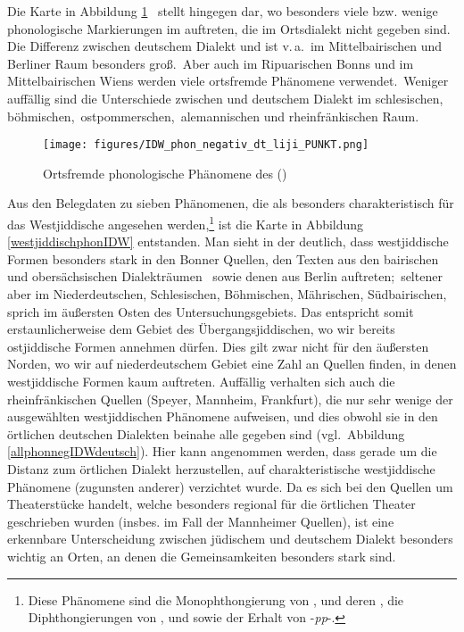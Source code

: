 {  
  
 Die Karte in Abbildung \ref{allphonnegIDW} \,%
  stellt hingegen dar, wo besonders viele bzw. wenige phonologische Markierungen im  auftreten, die im Ortsdialekt nicht gegeben sind. Die Differenz zwischen deutschem Dialekt und  ist v.\,a.\, im Mittelbairischen und Berliner Raum besonders groß.\, Aber auch im Ripuarischen Bonns und im Mittelbairischen Wiens werden viele ortsfremde Phänomene verwendet.\,  Weniger auffällig sind die Unterschiede zwischen  und deutschem Dialekt im schlesischen,\, böhmischen,\, ostpommerschen,\, alemannischen und rheinfränkischen Raum.
 

 \begin{figure} 
  \farbgrafik
		\centering
\texttt{[image: figures/IDW\_phon\_negativ\_dt\_liji\_PUNKT.png]}
		\caption{\label{allphonnegIDW} Ortsfremde phonologische Phänomene des  ()}
		\end{figure}

   
 Aus den Belegdaten zu sieben Phänomenen, die als besonders charakteristisch für das Westjiddische angesehen werden,\footnote{Diese Phänomene sind die Monophthongierung von ,  und deren , die Diphthongierungen von ,  und  sowie der Erhalt von {\germ} -\textit{pp}-.} ist die Karte in Abbildung \ref{westjiddischphonIDW} %
 entstanden. Man sieht in der  deutlich, dass westjiddische Formen besonders stark in den Bonner Quellen, den Texten aus den bairischen und obersächsischen Dialekträumen \,%
  sowie denen aus Berlin auftreten;\, seltener aber im Niederdeutschen, Schlesischen, Böhmischen, Mährischen, Südbairischen, sprich im äußersten Osten des Untersuchungsgebiets. Das  entspricht somit erstaunlicherweise dem Gebiet des Übergangsjiddischen, wo wir bereits ostjiddische Formen annehmen dürfen. Dies gilt zwar nicht für den äußersten Norden, wo wir auf niederdeutschem Gebiet eine Zahl an Quellen finden, in denen westjiddische Formen kaum auftreten. Auffällig verhalten sich auch die rheinfränkischen Quellen (Speyer, Mannheim, Frankfurt), die nur sehr wenige der ausgewählten westjiddischen Phänomene aufweisen, und dies obwohl sie in den örtlichen deutschen Dialekten beinahe alle gegeben sind (vgl.\, Abbildung \ref{allphonnegIDWdeutsch}). Hier kann angenommen werden, dass gerade um die Distanz zum örtlichen Dialekt herzustellen, auf charakteristische westjiddische Phänomene (zugunsten anderer) verzichtet wurde. Da es sich bei den Quellen um Theaterstücke handelt, welche besonders regional für die örtlichen Theater geschrieben wurden (insbes. im Fall der Mannheimer Quellen), ist eine erkennbare Unterscheidung zwischen jüdischem und deutschem Dialekt besonders wichtig an Orten, an denen die Gemeinsamkeiten besonders stark sind.

}
